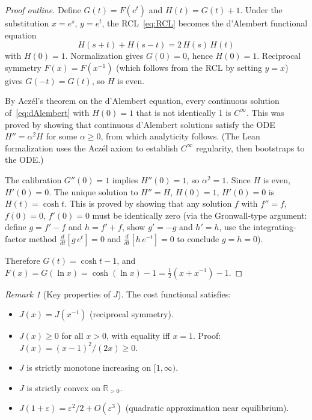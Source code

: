 \documentclass[12pt]{article}
\theoremstyle{definition}
\theoremstyle{remark}
\newtheorem{remark}[theorem]{Remark}
\begin{document}
\begin{proof}[Proof outline]
Define $G(t) = F(e^t)$ and $H(t) = G(t) + 1$. Under the substitution
$x = e^s$, $y = e^t$, the RCL~\eqref{eq:RCL} becomes the d'Alembert
functional equation
\begin{equation}
  H(s+t) + H(s-t) = 2\,H(s)\,H(t)
  \label{eq:dAlembert}
\end{equation}
with $H(0) = 1$. Normalization gives $G(0) = 0$, hence $H(0) = 1$.
Reciprocal symmetry $F(x) = F(x^{-1})$ (which follows from the RCL by
setting $y = x$) gives $G(-t) = G(t)$, so $H$ is even.

By Acz\'el's theorem on the d'Alembert equation, every continuous
solution of~\eqref{eq:dAlembert} with $H(0) = 1$ that is not
identically 1 is $C^\infty$. This was proved by showing that
continuous d'Alembert solutions satisfy the ODE $H'' = \alpha^2 H$
for some $\alpha \geq 0$, from which analyticity follows. (The Lean
formalization uses the Acz\'el axiom to establish $C^\infty$
regularity, then bootstraps to the ODE.)

The calibration $G''(0) = 1$ implies $H''(0) = 1$, so $\alpha^2 = 1$.
Since $H$ is even, $H'(0) = 0$. The unique solution to $H'' = H$,
$H(0) = 1$, $H'(0) = 0$ is $H(t) = \cosh t$. This is proved by
showing that any solution $f$ with $f'' = f$, $f(0) = 0$, $f'(0) = 0$
must be identically zero (via the Gronwall-type argument: define
$g = f' - f$ and $h = f' + f$, show $g' = -g$ and $h' = h$, use the
integrating-factor method $\frac{d}{dt}[g\,e^t] = 0$ and
$\frac{d}{dt}[h\,e^{-t}] = 0$ to conclude $g = h = 0$).

Therefore $G(t) = \cosh t - 1$, and
$F(x) = G(\ln x) = \cosh(\ln x) - 1 = \frac{1}{2}(x + x^{-1}) - 1$.
\end{proof}

\begin{remark}[Key properties of $J$]
The cost functional satisfies:
\begin{itemize}
  \item $J(x) = J(x^{-1})$ (reciprocal symmetry).
  \item $J(x) \geq 0$ for all $x > 0$, with equality iff $x = 1$.
    Proof: $J(x) = (x - 1)^2/(2x) \geq 0$.
  \item $J$ is strictly monotone increasing on $[1,\infty)$.
  \item $J$ is strictly convex on $\mathbb{R}_{>0}$.
  \item $J(1+\varepsilon) = \varepsilon^2/2 + O(\varepsilon^3)$
    (quadratic approximation near equilibrium).
\end{itemize}
\end{remark}
\end{document}
